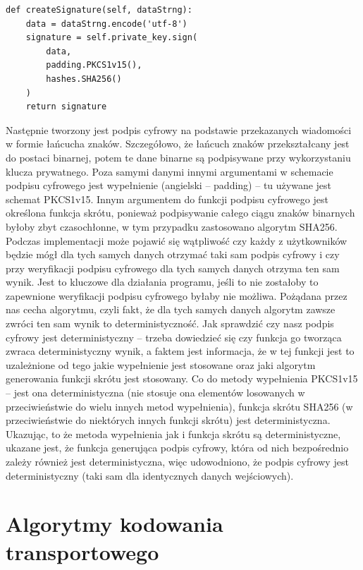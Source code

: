 \begin{lstlisting}
def createSignature(self, dataStrng):
    data = dataStrng.encode('utf-8')
    signature = self.private_key.sign(
        data,
        padding.PKCS1v15(),
        hashes.SHA256()
    )
    return signature
\end{lstlisting}
Następnie tworzony jest podpis cyfrowy na podstawie przekazanych wiadomości w formie łańcucha znaków. Szczegółowo, że łańcuch znaków przekształcany jest do postaci binarnej, potem te dane binarne są podpisywane przy wykorzystaniu klucza prywatnego. Poza samymi danymi innymi argumentami w schemacie podpisu cyfrowego jest wypełnienie (angielski – padding) – tu używane jest schemat PKCS1v15. Innym argumentem do funkcji podpisu cyfrowego jest określona funkcja skrótu, ponieważ podpisywanie całego ciągu znaków binarnych byłoby zbyt czasochłonne, w tym przypadku zastosowano algorytm SHA256. Podczas implementacji może pojawić się wątpliwość czy każdy z użytkowników będzie mógł dla tych samych danych otrzymać taki sam podpis cyfrowy i czy przy weryfikacji podpisu cyfrowego dla tych samych danych otrzyma ten sam wynik. Jest to kluczowe dla działania programu, jeśli to nie zostałoby to zapewnione weryfikacji podpisu cyfrowego byłaby nie możliwa. Pożądana przez nas cecha algorytmu, czyli fakt, że dla tych samych danych algorytm zawsze zwróci ten sam wynik to deterministyczność. Jak sprawdzić czy nasz podpis cyfrowy jest deterministyczny – trzeba dowiedzieć się czy funkcja go tworząca zwraca deterministyczny wynik, a faktem jest informacja, że w tej funkcji jest to uzależnione od tego jakie wypełnienie jest stosowane oraz jaki algorytm generowania funkcji skrótu jest stosowany. Co do metody wypełnienia PKCS1v15 – jest ona deterministyczna (nie stosuje ona elementów losowanych w przeciwieństwie do wielu innych metod wypełnienia), funkcja skrótu SHA256 (w przeciwieństwie do niektórych innych funkcji skrótu) jest deterministyczna. Ukazując, to że metoda wypełnienia jak i funkcja skrótu są deterministyczne, ukazane jest, że funkcja generująca podpis cyfrowy, która od nich bezpośrednio zależy również jest deterministyczna, więc udowodniono, że podpis cyfrowy jest deterministyczny (taki sam dla identycznych danych wejściowych).

\section{Algorytmy kodowania transportowego}
